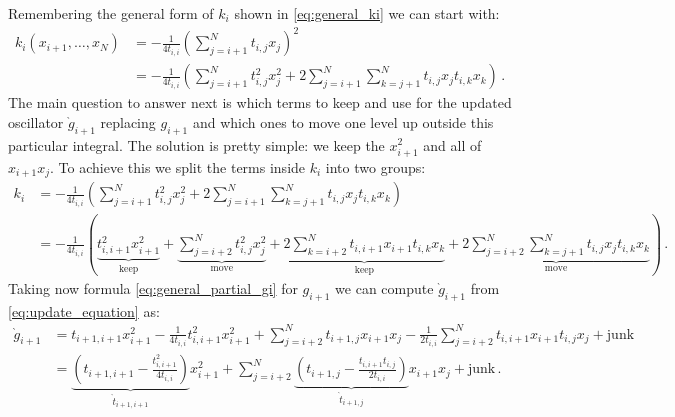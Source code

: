 \documentclass[a4paper,10pt]{article}
\begin{document}
Remembering the general form of $k_i$ shown in
\eqref{eq:general_ki} we can start with:
\begin{equation}
\begin{split}
  k_i(x_{i+1}, \ldots, x_N)
  & = - \frac{1}{4 t_{i,i}} \left( \sum_{j=i+1}^{N} t_{i,j} x_j \right)^2 \\
  & = - \frac{1}{4 t_{i,i}} \left( \sum_{j=i+1}^{N} t_{i,j}^2 x_j^2
                               + 2 \sum_{j=i+1}^{N} \sum_{k=j+1}^{N} t_{i,j} x_j t_{i,k} x_k
                            \right) \,.
\end{split}
\end{equation}
The main question to answer next is which terms to keep and use
for the updated oscillator $\grave{g}_{i+1}$ replacing $g_{i+1}$
and which ones to move one level up outside this particular integral.
The solution is pretty simple: we keep the $x_{i+1}^2$ and all of
$x_{i+1} x_j$. To achieve this we split the terms inside $k_i$
into two groups:
\begin{equation*}
\begin{split}
 k_i & = - \frac{1}{4 t_{i,i}}
         \left(
           \sum_{j=i+1}^{N} t_{i,j}^2 x_j^2
           + 2 \sum_{j=i+1}^{N} \sum_{k=j+1}^{N} t_{i,j} x_j t_{i,k} x_k
         \right) \\
     & = - \frac{1}{4 t_{i,i}}
         \left(
           \underbrace{t_{i,i+1}^2 x_{i+1}^2}_{\text{keep}}
           +
           \underbrace{\sum_{j=i+2}^{N} t_{i,j}^2 x_j^2}_{\text{move}}
           +
           \underbrace{2 \sum_{k=i+2}^{N} t_{i,i+1} x_{i+1} t_{i,k} x_k}_{\text{keep}}
           +
           \underbrace{2 \sum_{j=i+2}^{N} \sum_{k=j+1}^{N} t_{i,j} x_j t_{i,k} x_k}_{\text{move}}
         \right) \,.
\end{split}
\end{equation*}
Taking now formula \eqref{eq:general_partial_gi} for $g_{i+1}$
we can compute $\grave{g}_{i+1}$ from \eqref{eq:update_equation} as:
\begin{equation*}
\begin{split}
  \grave{g}_{i+1}
  & = t_{i+1,i+1} x_{i+1}^2 - \frac{1}{4 t_{i,i}} t_{i,i+1}^2 x_{i+1}^2
    + \sum_{j=i+2}^{N} t_{i+1,j} x_{i+1} x_j - \frac{1}{2 t_{i,i}} \sum_{j=i+2}^{N} t_{i,i+1} x_{i+1} t_{i,j} x_j
    + \text{junk} \\
  & = \underbrace{\left(t_{i+1,i+1} - \frac{t_{i,i+1}^2}{4 t_{i,i}}\right)}_{\grave{t}_{i+1,i+1}} x_{i+1}^2
    + \sum_{j=i+2}^{N} \underbrace{\left(t_{i+1,j} - \frac{t_{i,i+1} t_{i,j}}{2 t_{i,i}}\right)}_{\grave{t}_{i+1,j}} x_{i+1} x_j
    + \text{junk} \,.
\end{split}
\end{equation*}
\end{document}
